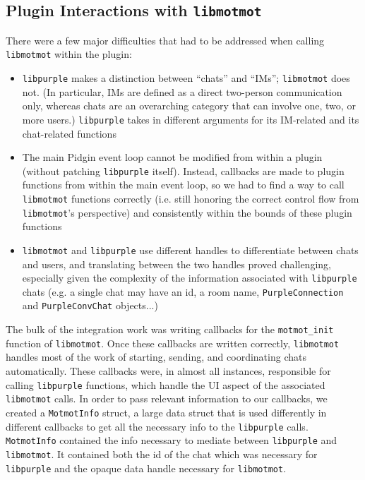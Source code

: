 \documentclass{sig-alternate}
\newcommand\libmotmot{\texttt{libmotmot}\xspace}
\newcommand\libpurple{\texttt{libpurple}\xspace}
\begin{document}
\subsection{Plugin Interactions with \libmotmot}
There were a few major difficulties that had to be addressed when calling
\libmotmot within the plugin:

\begin{itemize}
\item \libpurple makes a distinction between ``chats'' and ``IMs''; \libmotmot
does not.  (In particular, IMs are defined as a direct two-person communication
only, whereas chats are an overarching category that can involve one, two, or
more users.) \libpurple takes in different arguments for its IM-related and its
chat-related functions

\item The main Pidgin event loop cannot be modified from within a plugin
(without patching \libpurple itself).  Instead, callbacks are made to plugin
functions from within the main event loop, so we had to find a way to call
\libmotmot functions correctly (i.e. still honoring the correct control flow
from \libmotmot's perspective) and consistently within the bounds of these
plugin functions

\item \libmotmot and \libpurple use different handles to differentiate between
chats and users, and translating between the two handles proved challenging,
especially given the complexity of the information associated with \libpurple
chats (e.g. a single chat may have an id, a room name, \verb`PurpleConnection`
and \verb`PurpleConvChat` objects...)

\end{itemize}

The bulk of the integration work was writing callbacks for the
\verb`motmot_init` function of \libmotmot.  Once these callbacks are written
correctly, \libmotmot handles most of the work of starting, sending, and
coordinating chats automatically.  These callbacks were, in almost all
instances, responsible for calling \libpurple functions, which handle the UI
aspect of the associated \libmotmot calls.  In order to pass relevant
information to our callbacks, we created a \verb`MotmotInfo` struct, a large
data struct that is used differently in different callbacks to get all the
necessary info to the \libpurple calls. \verb`MotmotInfo` contained the info
necessary to mediate between \libpurple and \libmotmot. It contained both the
id of the chat which was necessary for \libpurple and the opaque data handle
necessary for \libmotmot.
\end{document}

